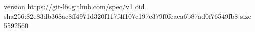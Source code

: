 version https://git-lfs.github.com/spec/v1
oid sha256:82e83db368ac8ff4971d320f117f4f107c197c379f0feaea6b87ad0f76549fb8
size 5592560
